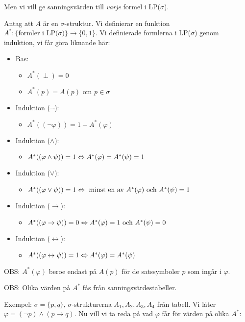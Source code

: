 \noindent Men vi vill ge sanningsvärden till \textit{varje} formel i LP($\sigma$).
\par\bigskip
\noindent Antag att $A$ är en $\sigma$-struktur. Vi definierar en funktion $A^*:\{\text{formler i LP(}\sigma\text{)}\}\rightarrow \{0,1\}$. Vi definierade formlerna i LP($\sigma$) genom induktion, vi får göra liknande här:
\par\bigskip

\begin{itemize}
  \item Bas:
    \begin{itemize}
      \item $A^*(\perp)=0$\\
      \item $A^*(p)=A(p) \text{ om } p\in\sigma$
    \end{itemize}
    \par\bigskip
  \item Induktion ($\neg$):
    \begin{itemize}
      \item$A^*((\neg\varphi))=1-A^*(\varphi)$
    \end{itemize}
    \par\bigskip
  \item Induktion ($\wedge$):
    \begin{itemize}
      \item $A^*((\varphi\wedge\psi))=1\Leftrightarrow A^*(\varphi)=A^*(\psi)=1$
    \end{itemize}
    \par\bigskip
  \item Induktion ($\vee$):
    \begin{itemize}
      \item $A^*((\varphi\vee\psi))=1\Leftrightarrow\text{ minst en av } A^*(\varphi) \text{ och } A^*(\psi)=1$
    \end{itemize}
    \par\bigskip
  \item Induktion ($\rightarrow$):
    \begin{itemize}
      \item $A^*((\varphi\rightarrow\psi))=0\Leftrightarrow A^*(\varphi)=1 \text{ och } A^*(\psi)=0$
    \end{itemize}
    \par\bigskip
  \item Induktion ($\leftrightarrow$):
    \begin{itemize}
      \item $A^*((\varphi\leftrightarrow\psi))=1\Leftrightarrow A^*(\varphi)=A^*(\psi)$
    \end{itemize}
\end{itemize}
\par\bigskip
\noindent OBS: $A^*(\varphi)$ beroe endast på $A(p)$ för de satssymboler $p$ som ingår i $\varphi$.
\par\bigskip
\noindent OBS: Olika värden på $A^*$ fås från sanningsvärdestabeller.
\par\bigskip
\noindent Exempel: $\sigma = \{p, q\}$, $\sigma$-strukturerna $A_1, A_2, A_3, A_4$ från tabell. Vi låter $\varphi=(\neg p)\wedge (p\rightarrow q)$. Nu vill vi ta reda på vad $\varphi$ får för värden på olika $A^*$:

